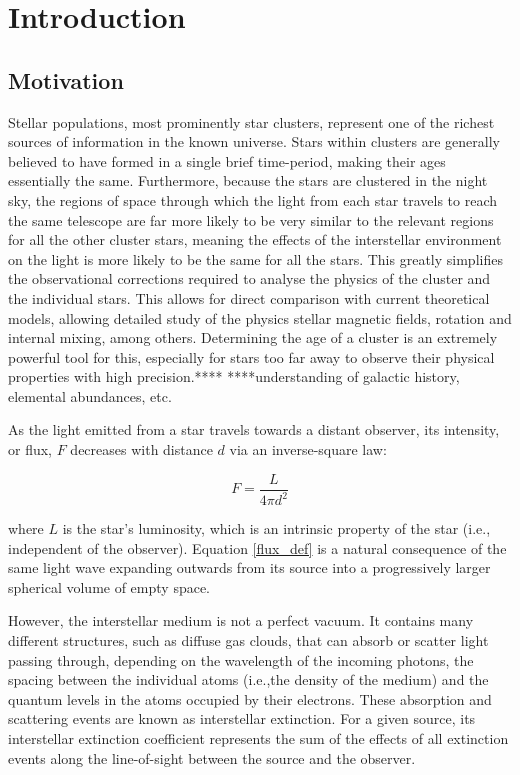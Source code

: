 \documentclass[12pt, a4paper]{report}
\begin{document}
\chapter{Introduction}
\section{Motivation}

Stellar populations, most prominently star clusters, represent one of the richest sources of information in the known universe. Stars within clusters are generally believed to have formed in a single brief time-period, making their ages essentially the same. Furthermore, because the stars are clustered in the night sky, the regions of space through which the light from each star travels to reach the same telescope are far more likely to be very similar to the relevant regions for all the other cluster stars, meaning the effects of the interstellar environment on the light is more likely to be the same for all the stars. This greatly simplifies the observational corrections required to analyse the physics of the cluster and the individual stars. This allows for direct comparison with current theoretical models, allowing detailed study of the physics stellar magnetic fields, rotation and internal mixing, among others. Determining the age of a cluster is an extremely powerful tool for this, especially for stars too far away to observe their physical properties with high precision.**** ****understanding of galactic history, elemental abundances, etc.

As the light emitted from a star travels towards a distant observer, its intensity, or flux, $F$ decreases with distance $d$ via an inverse-square law:

\begin{equation}
\label{flux_def}
F = \frac{L}{4 \pi d^{2}}
\end{equation}

where $L$ is the star's luminosity, which is an intrinsic property of the star (i.e., independent of the observer). Equation \ref{flux_def} is a natural consequence of the same light wave expanding outwards from its source into a progressively larger spherical volume of empty space.

However, the interstellar medium is not a perfect vacuum. It contains many different structures, such as diffuse gas clouds, that can absorb or scatter light passing through, depending on the wavelength of the incoming photons, the spacing between the individual atoms (i.e.,the density of the medium) and the quantum levels in the atoms occupied by their electrons. These absorption and scattering events are known as interstellar extinction. For a given source, its interstellar extinction coefficient represents the sum of the effects of all extinction events along the line-of-sight between the source and the observer.
\end{document}
